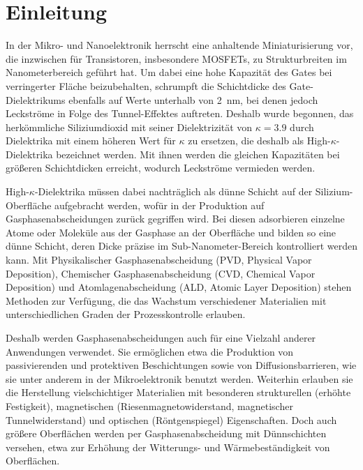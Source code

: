 \chapter{Einleitung}
\label{intro}


In der Mikro- und Nanoelektronik herrscht eine anhaltende Miniaturisierung vor, die inzwischen für Transistoren, insbesondere MOSFETs, zu Strukturbreiten im Nanometerbereich geführt hat.
Um dabei eine hohe Kapazität des Gates bei verringerter Fläche beizubehalten, schrumpft die Schichtdicke des Gate-Dielektrikums ebenfalls auf Werte unterhalb von \SI{2}{\nano\meter}, bei denen jedoch Leckströme in Folge des Tunnel-Effektes auftreten.
Deshalb wurde begonnen, das herkömmliche Siliziumdioxid mit seiner Dielektrizität von $\kappa=\num{3.9}$ durch Dielektrika mit einem höheren Wert für $\kappa$ zu ersetzen, die deshalb als High-$\kappa$-Dielektrika bezeichnet werden.
Mit ihnen werden die gleichen Kapazitäten bei größeren Schichtdicken erreicht, wodurch Leckströme vermieden werden.


High-$\kappa$-Dielektrika müssen dabei nachträglich als dünne Schicht auf der Silizium-Oberfläche aufgebracht werden, wofür in der Produktion auf Gasphasenabscheidungen zurück gegriffen wird.
Bei diesen adsorbieren einzelne Atome oder Moleküle aus der Gasphase an der Oberfläche und bilden so eine dünne Schicht, deren Dicke präzise im Sub-Nanometer-Bereich kontrolliert werden kann.
Mit Physikalischer Gasphasenabscheidung (PVD, Physical Vapor Deposition), Chemischer Gasphasenabscheidung (CVD, Chemical Vapor Deposition) und Atomlagenabscheidung (ALD, Atomic Layer Deposition) stehen Methoden zur Verfügung, die das Wachstum verschiedener Materialien mit unterschiedlichen Graden der Prozesskontrolle erlauben.

Deshalb werden Gasphasenabscheidungen auch für eine Vielzahl anderer Anwendungen verwendet.
Sie ermöglichen etwa die Produktion von passivierenden und protektiven Beschichtungen sowie von Diffusionsbarrieren, wie sie unter anderem in der Mikroelektronik benutzt werden.
Weiterhin erlauben sie die Herstellung vielschichtiger Materialien mit besonderen strukturellen (erhöhte Festigkeit), magnetischen (Riesenmagnetowiderstand, magnetischer Tunnelwiderstand) und optischen (Röntgenspiegel) Eigenschaften.
Doch auch größere Oberflächen werden per Gasphasenabscheidung mit Dünnschichten versehen, etwa zur Erhöhung der Witterungs- und Wärmebeständigkeit von Oberflächen.

